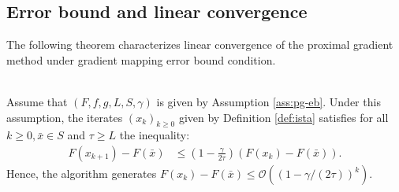 \documentclass[12pt]{article}
\begin{document}
    \subsection{Error bound and linear convergence}
        The following theorem characterizes linear convergence of the proximal gradient method under gradient mapping error bound condition. 
        \begin{theorem}\;\label{thm:lin-cnvg-ista-eb}\\
            Assume that $(F, f, g, L, S, \gamma)$ is given by Assumption \ref{ass:pg-eb}. 
            Under this assumption, the iterates $(x_k)_{k \ge 0}$ given by Definition \ref{def:ista} satisfies for all $k \ge 0, \bar x \in S$ and $\tau \ge L$ the inequality: 
            \begin{align*}
                F(x_{k + 1}) - F(\bar x)
                &\le 
                \left(
                    1 - \frac{\gamma}{2\tau}
                \right)(F(x_k) - F(\bar x)). 
            \end{align*}
            Hence, the algorithm generates $F(x_k) - F(\bar x)\le \mathcal O((1 - \gamma/(2\tau))^k)$. 
        \end{theorem}
\end{document}

